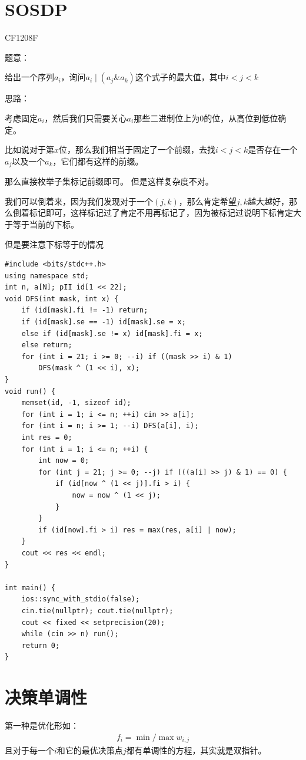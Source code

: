\section{SOSDP}
CF1208F\par
题意：\par
给出一个序列$a_i$，询问$a_i \;|\; (a_j \& a_k)$这个式子的最大值，其中$i < j < k$\par
思路：\par
考虑固定$a_i$，然后我们只需要关心$a_i$那些二进制位上为$0$的位，从高位到低位确定。\par
比如说对于第$x$位，那么我们相当于固定了一个前缀，去找$i < j < k$是否存在一个$a_j$以及一个$a_k$，它们都有这样的前缀。\par
那么直接枚举子集标记前缀即可。 但是这样复杂度不对。\par
我们可以倒着来，因为我们发现对于一个$(j, k)$，那么肯定希望$j, k$越大越好，那么倒着标记即可，这样标记过了肯定不用再标记了，因为被标记过说明下标肯定大于等于当前的下标。\par
但是要注意下标等于的情况\par
\begin{lstlisting}
#include <bits/stdc++.h>
using namespace std;
int n, a[N]; pII id[1 << 22];  
void DFS(int mask, int x) {
	if (id[mask].fi != -1) return;
	if (id[mask].se == -1) id[mask].se = x;
	else if (id[mask].se != x) id[mask].fi = x;
	else return;
	for (int i = 21; i >= 0; --i) if ((mask >> i) & 1)
		DFS(mask ^ (1 << i), x);
}
void run() {
	memset(id, -1, sizeof id); 
	for (int i = 1; i <= n; ++i) cin >> a[i];
	for (int i = n; i >= 1; --i) DFS(a[i], i);
	int res = 0;
	for (int i = 1; i <= n; ++i) {
		int now = 0;
		for (int j = 21; j >= 0; --j) if (((a[i] >> j) & 1) == 0) {
			if (id[now ^ (1 << j)].fi > i) { 
				now = now ^ (1 << j); 
			}
		}
		if (id[now].fi > i) res = max(res, a[i] | now);
	}
	cout << res << endl;
}

int main() {
	ios::sync_with_stdio(false);
	cin.tie(nullptr); cout.tie(nullptr);
	cout << fixed << setprecision(20);
	while (cin >> n) run();
	return 0;
}
\end{lstlisting}

\section{决策单调性}

第一种是优化形如：
\begin{eqnarray*}
f_{i}=\min/\max w_{i,j}
\end{eqnarray*}
且对于每一个$i$和它的最优决策点$j$都有单调性的方程，其实就是双指针。\par

